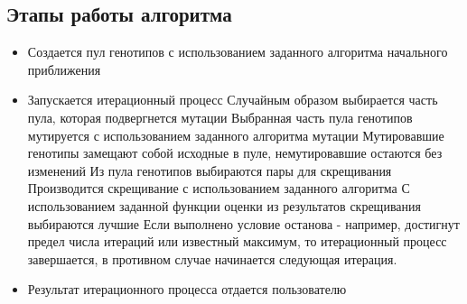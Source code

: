 \subsection{Этапы работы алгоритма}%
\begin{itemize}%
\item Создается пул генотипов с использованием заданного алгоритма начального приближения
\item Запускается итерационный процесс
	\subitem Случайным образом выбирается часть пула, которая подвергнется мутации
	\subitem Выбранная часть пула генотипов мутируется с использованием заданного алгоритма мутации
	\subitem Мутировавшие генотипы замещают собой исходные в пуле, немутировавшие остаются без изменений
	\subitem Из пула генотипов выбираются пары для скрещивания
	\subitem Производится скрещивание с использованием заданного алгоритма
	\subitem С использованием заданной функции оценки из результатов скрещивания выбираются лучшие 
	\subitem Если выполнено условие останова - например, достигнут предел числа итераций или известный максимум, то итерационный процесс завершается, в противном случае  начинается следующая итерация.
\item Результат итерационного процесса отдается пользователю
\end{itemize}

